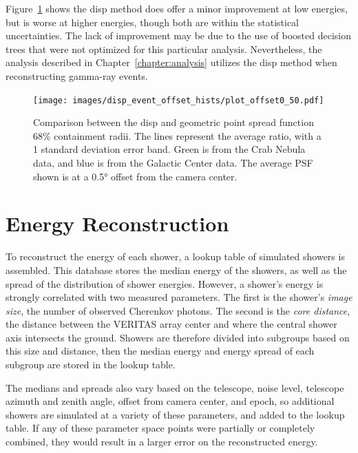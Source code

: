 Figure~\ref{fig:disp_psf_comparison} shows the disp method does offer a minor improvement at low energies, but is worse at higher energies, though both are within the statistical uncertainties.
The lack of improvement may be due to the use of boosted decision trees that were not optimized for this particular analysis.
Nevertheless, the analysis described in Chapter~\ref{chapter:analysis} utilizes the disp method when reconstructing gamma-ray events.
    
\begin{figure}[b]
  \centering
  \texttt{[image: images/disp\_event\_offset\_hists/plot\_offset0\_50.pdf]}
  \caption[Disp Point Spread Function Comparison]{
    Comparison between the disp and geometric point spread function 68\% containment radii.
    The lines represent the average ratio, with a 1 standard deviation error band.
    Green is from the Crab Nebula data, and blue is from the Galactic Center data.
    The average PSF shown is at a \ang{0.5} offset from the camera center.
  }
  \label{fig:disp_psf_comparison}
\end{figure}

\FloatBarrier

\section{Energy Reconstruction}\label{subsec:enrecon}

To reconstruct the energy of each shower, a lookup table of simulated showers is assembled.
This database stores the median energy of the showers, as well as the spread of the distribution of shower energies.
However, a shower's energy is strongly correlated with two measured parameters.
The first is the shower's \textit{image size}, the number of observed Cherenkov photons.
The second is the \textit{core distance}, the distance between the VERITAS array center and where the central shower axis intersects the ground.
Showers are therefore divided into subgroups based on this size and distance, then the median energy and energy spread of each subgroup are stored in the lookup table.

The medians and spreads also vary based on the telescope, noise level, telescope azimuth and zenith angle, offset from camera center, and epoch, so additional showers are simulated at a variety of these parameters, and added to the lookup table.
If any of these parameter space points were partially or completely combined, they would result in a larger error on the reconstructed energy.

